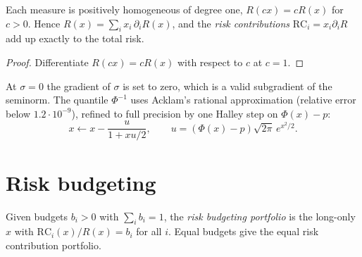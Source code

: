 \begin{proposition}
Each measure is positively homogeneous of degree one, $R(cx)=cR(x)$ for $c>0$. Hence
$R(x)=\sum_ix_i\,\partial_iR(x)$, and the \emph{risk contributions}
$\mathrm{RC}_i=x_i\partial_iR$ add up exactly to the total risk.
\end{proposition}
\begin{proof}
Differentiate $R(cx)=cR(x)$ with respect to $c$ at $c=1$.
\end{proof}
At $\sigma=0$ the gradient of $\sigma$ is set to zero, which is a valid subgradient of the
seminorm. The quantile $\Phi^{-1}$ uses Acklam's rational approximation (relative error
below $1.2\cdot10^{-9}$), refined to full precision by one Halley step on $\Phi(x)-p$:
\[
  x\leftarrow x-\frac{u}{1+xu/2},\qquad u=(\Phi(x)-p)\sqrt{2\pi}\,e^{x^2/2}.
\]
\begin{codepointers}
\end{codepointers}

\chapter{Risk budgeting}\label{c:sec:riskbudgeting}

Given budgets $b_i>0$ with $\sum_ib_i=1$, the \emph{risk budgeting portfolio} is the
long-only $x$ with $\mathrm{RC}_i(x)/R(x)=b_i$ for all $i$. Equal budgets give the equal risk
contribution portfolio.

